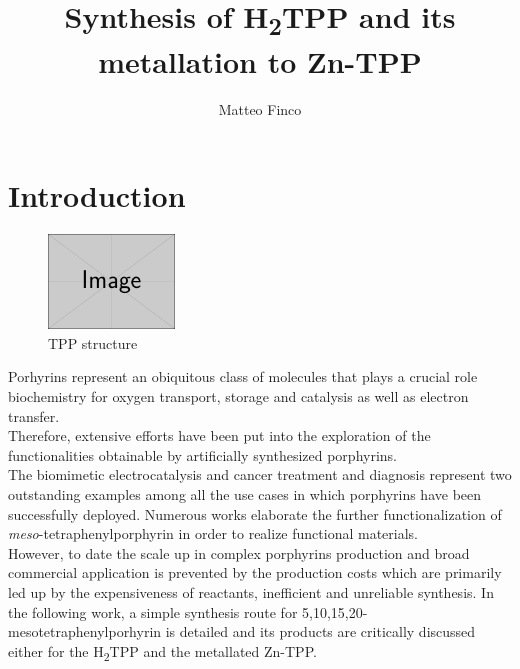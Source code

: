 \documentclass[num-refs]{wiley-article}
\title{Synthesis of \texorpdfstring{H\textsubscript{2}}-TPP and its metallation to Zn-TPP}
\author[1\authfn{1}]{Matteo Finco}
\affil[1]{DiSC, Università degli Studi di Padova, Padova, Italy, 35131, Italy}
\begin{document}
\begin{frontmatter}
\maketitle

\begin{abstract}

\end{abstract}
\end{frontmatter}

\section{Introduction}
\begin{figure}[t]
    \leftalign
    \includegraphics[width=0.3\textwidth]{example-image-rectangle}
    \caption{TPP structure}
    \label{TPP-structure}
\end{figure}
Porhyrins represent an obiquitous class of molecules that plays a crucial role biochemistry for oxygen transport\cite{hardison_evolution_2012}, storage\citep{kendrew_three-dimensional_1958} and catalysis as well as electron transfer\citep{keilin_cytochrome_1925}.\\
Therefore, extensive efforts have been put into the exploration of the functionalities obtainable by artificially synthesized porphyrins.\\
The biomimetic electrocatalysis\cite{facchin_oxygen_2021}\cite{liang_porphyrin-based_2021} and cancer treatment and diagnosis\cite{wang_recent_2021} represent two outstanding examples among all the use cases in which porphyrins have been successfully deployed.
Numerous works elaborate the further functionalization of \textit{meso}-tetraphenylporphyrin\cite{silva_porphyrins_2006} in order to realize functional materials. \\
However, to date the scale up in complex porphyrins production and broad commercial application is prevented by the production costs which are primarily led up by the expensiveness of reactants, inefficient and unreliable synthesis.
In the following work, a simple synthesis route for 5,10,15,20-mesotetraphenylporhyrin is detailed and its products are critically discussed either for the \texorpdfstring{H\textsubscript{2}}-TPP and the metallated Zn-TPP.
\end{document}
